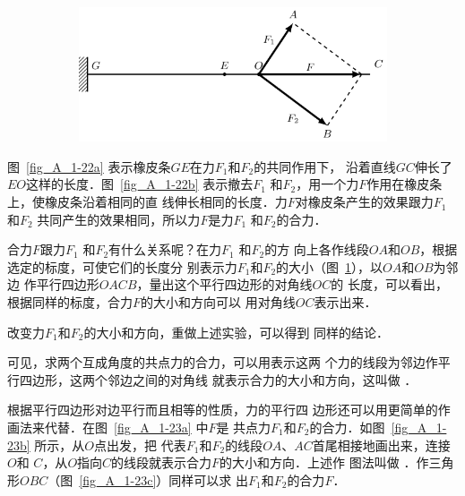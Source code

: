 \begin{figure}[htbp]
    \begin{subfigure} {1\linewidth} 
        \centering
        \includegraphics{fig/A/1-22c.pdf} 
        \caption{} \label{fig_A_1-22c} 
    \end{subfigure} 
    \caption{} \label{fig_A_1-22} 
\end{figure} 



    图~\ref{fig_A_1-22a} 表示橡皮条$GE$在力$F_1$和$F_2$的共同作用下，
沿着直线$GC$伸长了$EO$这样的长度．图~\ref{fig_A_1-22b} 表示撤去$F_1$
和$F_2$，用一个力$F$作用在橡皮条上，使橡皮条沿着相同的直
线伸长相同的长度．力$F$对橡皮条产生的效果跟力$F_1$
和$F_2$
共同产生的效果相同，所以力$F$是力$F_1$
和$F_2$的合力．




    合力$F$跟力$F_1$
和$F_2$有什么关系呢？在力$F_1$
和$F_2$的方
向上各作线段$OA$和$OB$，根据选定的标度，可使它们的长度分
别表示力$F_1$和$F_2$的大小（图~\ref{fig_A_1-22c}），以$OA$和$OB$为邻边
作平行四边形$OACB$，量出这个平行四边形的对角线$OC$的
长度，可以看出，根据同样的标度，合力$F$的大小和方向可以
用对角线$OC$表示出来．

    改变力$F_1$和$F_2$的大小和方向，重做上述实验，可以得到
同样的结论．

    可见，求两个互成角度的共点力的合力，可以用表示这两
个力的线段为邻边作平行四边形，这两个邻边之间的对角线
就表示合力的大小和方向，这叫做 ．

    根据平行四边形对边平行而且相等的性质，力的平行四
边形还可以用更简单的作画法来代替．在图~\ref{fig_A_1-23a} 中$F$是
共点力$F_1$和$F_2$的合力．如图~\ref{fig_A_1-23b} 所示，从$O$点出发，把
代表$F_1$和$F_2$的线段$OA$、$AC$首尾相接地画出来，连接$O$和
$C$，从$O$指向$C$的线段就表示合力$F$的大小和方向．上述作
图法叫做 ．作三角形$OBC$（图~\ref{fig_A_1-23c}）同样可以求
出$F_1$和$F_2$的合力$F$．


